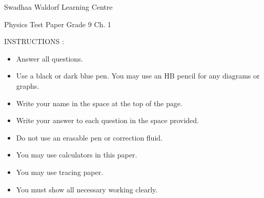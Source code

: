 \documentclass[12pt,addpoints]{exam}
\begin{document}
\begin{coverpages}

\begin{center}
  \begin{Large}
\vspace{-0.3in}
Swadhaa Waldorf Learning Centre

Physics Test Paper Grade 9 Ch. 1

\end{Large}
\end{center}

\vspace{0.5in}

\begin{center} 
  \bigskip

  INSTRUCTIONS :
  \begin{itemize}
    \item Answer all questions.
    \item Use a black or dark blue pen. You may use an HB pencil for any diagrams or graphs.
    \item Write your name in the space at the top of the page.
    \item Write your answer to each question in the space provided.
    \item Do not use an erasable pen or correction fluid.
    \item You may use calculators in this paper.
    \item You may use tracing paper.
	\item You must show all necessary working clearly.
  \end{itemize}


\end{center}

\vspace{1.1in}

\begin{center}
\begin{small}
\begingroup
  \gradetable[h]
\endgroup
\end{small}
\end{center}


\end{coverpages}
\end{document}
